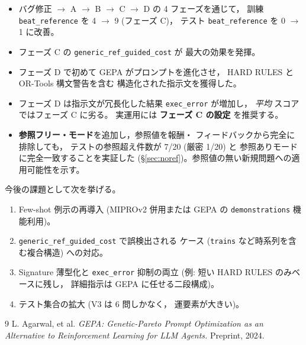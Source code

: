 \documentclass[uplatex,dvipdfmx,a4paper,11pt]{jsarticle}
\begin{document}
\begin{itemize}
  \item バグ修正 $\rightarrow$ A $\rightarrow$ B $\rightarrow$ C $\rightarrow$ D の
    4 フェーズを通じて，
    訓練 \texttt{beat\_reference} を 4 $\rightarrow$ 9 (フェーズ C)，
    テスト \texttt{beat\_reference} を 0 $\rightarrow$ 1 に改善。
  \item フェーズ C の \texttt{generic\_ref\_guided\_cost} が
    最大の効果を発揮。
  \item フェーズ D で初めて GEPA がプロンプトを進化させ，
    HARD RULES と OR-Tools 構文警告を含む
    構造化された指示文を獲得した。
  \item フェーズ D は指示文が冗長化した結果 \texttt{exec\_error}
    が増加し，
    \emph{平均} スコアではフェーズ C に劣る。
    実運用には \textbf{フェーズ C の設定} を推奨する。
  \item \textbf{参照フリー・モード}を追加し，参照値を報酬・
    フィードバックから完全に排除しても，
    テストの参照超え件数が 7/20 (厳密 1/20) と
    参照ありモードに完全一致することを実証した
    (\S\ref{sec:noref})。参照値の無い新規問題への適用可能性を示す。
\end{itemize}

今後の課題として次を挙げる。

\begin{enumerate}
  \item Few-shot 例示の再導入 (MIPROv2 併用または GEPA の
    \texttt{demonstrations} 機能利用)。
  \item \texttt{generic\_ref\_guided\_cost} で誤検出される
    ケース (\texttt{trains} など時系列を含む複合構造) への対応。
  \item Signature 薄型化と \texttt{exec\_error} 抑制の両立
    (例: 短い HARD RULES のみベースに残し，
    詳細指示は GEPA に任せる二段構成)。
  \item テスト集合の拡大 (V3 は 6 問しかなく，
    運要素が大きい)。
\end{enumerate}

\begin{thebibliography}{9}
  L. Agarwal, et al.
  \emph{GEPA: Genetic-Pareto Prompt Optimization
  as an Alternative to Reinforcement Learning for LLM Agents.}
  Preprint, 2024.
\end{thebibliography}
\end{document}
